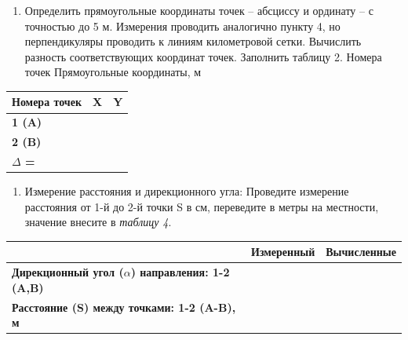 \documentclass[
  russian,
  letterpaper,
  DIV=11,
  numbers=noendperiod]{scrreprt}
\providecommand{\tightlist}{%
  \setlength{\itemsep}{0pt}\setlength{\parskip}{0pt}}
\begin{document}
\begin{enumerate}
\def\labelenumi{\arabic{enumi}.}
\setcounter{enumi}{4}
\tightlist
\item
  Определить прямоугольные координаты точек -- абсциссу и ординату -- с
  точностью до 5 м. Измерения проводить аналогично пункту 4, но
  перпендикуляры проводить к линиям километровой сетки. Вычислить
  разность соответствующих координат точек. Заполнить таблицу 2. Номера
  точек Прямоугольные координаты, м
\end{enumerate}

\begin{longtable}[]{@{}lll@{}}
\toprule\noalign{}
Номера точек & X & Y \\
\midrule\noalign{}
\endhead
\bottomrule\noalign{}
\endlastfoot
\textbf{1 (A)} & & \\
\textbf{2 (B)} & & \\
\textbf{\(\Delta\) =} & & \\
\end{longtable}

\begin{enumerate}
\def\labelenumi{\arabic{enumi}.}
\setcounter{enumi}{5}
\tightlist
\item
  Измерение расстояния и дирекционного угла: Проведите измерение
  расстояния от 1-й до 2-й точки S в см, переведите в метры на
  местности, значение внесите в \emph{таблицу 4}.
\end{enumerate}

\begin{longtable}[]{@{}
  >{\raggedright\arraybackslash}p{}
  >{\raggedright\arraybackslash}p{}
  >{\raggedright\arraybackslash}p{}@{}}
\toprule\noalign{}
\begin{minipage}[b]{\linewidth}\raggedright
\end{minipage} & \begin{minipage}[b]{\linewidth}\raggedright
Измеренный
\end{minipage} & \begin{minipage}[b]{\linewidth}\raggedright
Вычисленные
\end{minipage} \\
\midrule\noalign{}
\endhead
\bottomrule\noalign{}
\endlastfoot
\textbf{Дирекционный угол (\(\alpha\)) направления: 1-2 (A,B)} & & \\
\textbf{Расстояние (S) между точками: 1-2 (A-B), м} & & \\
\end{longtable}
\end{document}
